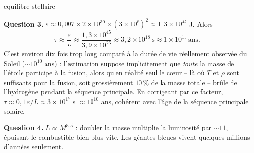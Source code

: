 \begin{exo}{equilibre-stellaire}
\begin{solution}
\textbf{Question 3.} $\varepsilon \approx 0{,}007 \times 2\times10^{30} \times (3\times10^8)^2 \approx 1{,}3\times10^{45}$ J. Alors
\[
\tau \approx \frac{\varepsilon}{L} \approx \frac{1{,}3\times10^{45}}{3{,}9\times10^{26}} \approx 3{,}2\times10^{18}\ \text{s} \approx 1\times10^{11}\ \text{ans}.
\]
C'est environ dix fois trop long comparé à la durée de vie réellement observée du Soleil ($\sim 10^{10}$ ans) : l'estimation suppose implicitement que \emph{toute} la masse de l'étoile participe à la fusion, alors qu'en réalité seul le cœur -- là où $T$ et $\rho$ sont suffisants pour la fusion, soit grossièrement $10\,\%$ de la masse totale -- brûle de l'hydrogène pendant la séquence principale. En corrigeant par ce facteur, $\tau \approx 0{,}1\,\varepsilon/L \approx 3\times10^{17}$ s $\approx 10^{10}$ ans, cohérent avec l'âge de la séquence principale solaire.

\textbf{Question 4.} $L \propto M^{3{,}5}$ : doubler la masse multiplie la luminosité par $\sim 11$, épuisant le combustible bien plus vite. Les géantes bleues vivent quelques millions d'années seulement.
\end{solution}
\end{exo}


